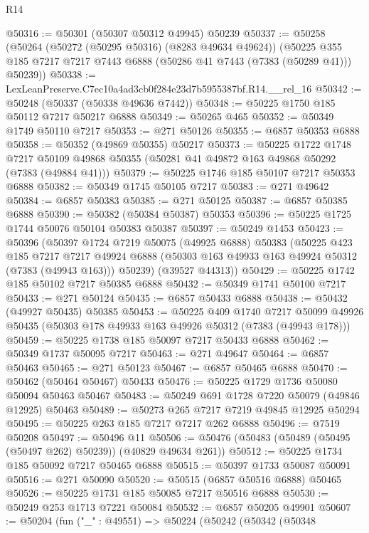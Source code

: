 \begin{lexlean}{R14}
\begin{coremodule}
@50316 := @50301 (@50307 @50312 @49945) @50239
@50337 := @50258
    (@50264
      (@50272 (@50295 @50316) (@8283 @49634 @49624))
      (@50225 @355 @185 @7217 @7217 @7443 @6888 (@50286 @41 @7443 (@7383 (@50289 @41))) @50239))
@50338 := LexLeanPreserve.C7ec10a4ad3cb0f284e23d7b5955387bf.R14.__rel_16
@50342 := @50248 (@50337 (@50338 @49636 @7442))
@50348 := @50225 @1750 @185 @50112 @7217 @50217 @6888
@50349 := @50265 @465
@50352 := @50349 @1749 @50110 @7217
@50353 := @271 @50126
@50355 := @6857 @50353 @6888
@50358 := @50352 (@49869 @50355) @50217
@50373 := @50225
    @1722
    @1748
    @7217
    @50109
    @49868
    @50355
    (@50281 @41 @49872 @163 @49868 @50292 (@7383 (@49884 @41)))
@50379 := @50225 @1746 @185 @50107 @7217 @50353 @6888
@50382 := @50349 @1745 @50105 @7217
@50383 := @271 @49642
@50384 := @6857 @50383
@50385 := @271 @50125
@50387 := @6857 @50385 @6888
@50390 := @50382 (@50384 @50387) @50353
@50396 := @50225 @1725 @1744 @50076 @50104 @50383 @50387
@50397 := @50249 @1453
@50423 := @50396
    (@50397
      @1724
      @7219
      @50075
      (@49925 @6888)
      @50383
      (@50225
        @423
        @185
        @7217
        @7217
        @49924
        @6888
        (@50303 @163 @49933 @163 @49924 @50312 (@7383 (@49943 @163)))
        @50239)
      (@39527 @44313))
@50429 := @50225 @1742 @185 @50102 @7217 @50385 @6888
@50432 := @50349 @1741 @50100 @7217
@50433 := @271 @50124
@50435 := @6857 @50433 @6888
@50438 := @50432 (@49927 @50435) @50385
@50453 := @50225
    @409
    @1740
    @7217
    @50099
    @49926
    @50435
    (@50303 @178 @49933 @163 @49926 @50312 (@7383 (@49943 @178)))
@50459 := @50225 @1738 @185 @50097 @7217 @50433 @6888
@50462 := @50349 @1737 @50095 @7217
@50463 := @271 @49647
@50464 := @6857 @50463
@50465 := @271 @50123
@50467 := @6857 @50465 @6888
@50470 := @50462 (@50464 @50467) @50433
@50476 := @50225 @1729 @1736 @50080 @50094 @50463 @50467
@50483 := @50249 @691 @1728 @7220 @50079 (@49846 @12925) @50463
@50489 := @50273 @265 @7217 @7219 @49845 @12925 @50294
@50495 := @50225 @263 @185 @7217 @7217 @262 @6888
@50496 := @7519 @50208
@50497 := @50496 @11
@50506 := @50476 (@50483 (@50489 (@50495 (@50497 @262) @50239)) (@40829 @49634 @261))
@50512 := @50225 @1734 @185 @50092 @7217 @50465 @6888
@50515 := @50397 @1733 @50087 @50091
@50516 := @271 @50090
@50520 := @50515 (@6857 @50516 @6888) @50465
@50526 := @50225 @1731 @185 @50085 @7217 @50516 @6888
@50530 := @50249 @253 @1713 @7221 @50084
@50532 := @6857 @50205 @49901
@50607 := @50204
    (fun ("_" : @49551) =>
    @50224
      (@50242
        (@50342
          (@50348

\end{coremodule}
\end{lexlean}
